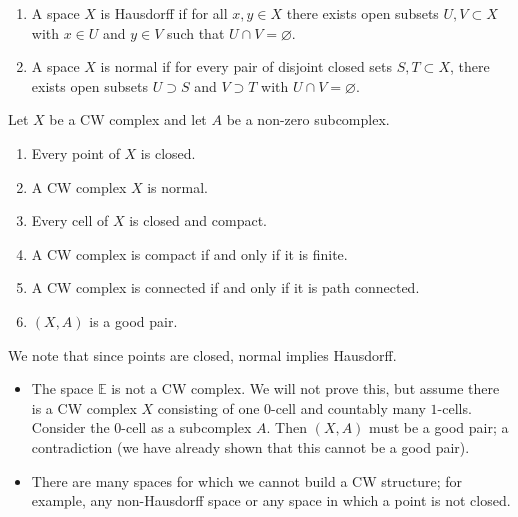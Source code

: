\begin{definition}
  \hspace{0em}
  \begin{enumerate}
    \item A space $X$ is Hausdorff if for all $x, y \in X$ there exists open subsets $U, V \subset X$ with $x \in U$ and $y \in V$ such that $U \cap V = \varnothing$.
    \item A space $X$ is normal if for every pair of disjoint closed sets $S, T \subset X$, there exists open subsets $U \supset S$ and $V \supset T$  with $U \cap V = \varnothing$.
  \end{enumerate}
\end{definition}

\begin{theorem}
  Let $X$ be a CW complex and let $A$ be a non-zero subcomplex.
  \begin{enumerate}
    \item Every point of $X$ is closed.
    \item A CW complex $X$ is normal.
    \item Every cell of $X$ is closed and compact.
    \item A CW complex is compact if and only if it is finite.
    \item A CW complex is connected if and only if it is path connected.
    \item $(X,A)$ is a good pair.
  \end{enumerate}
\end{theorem}

We note that since points are closed, normal implies Hausdorff.

\begin{example}
  \hspace{0em}
  \begin{itemize}
    \item The space $\mathbb E$ is not a CW complex. We will not prove this, but assume there is a CW complex $X$ consisting of one $0$-cell and countably many $1$-cells. Consider the $0$-cell as a subcomplex $A$. Then $(X,A)$ must be a good pair; a contradiction (we have already shown that this cannot be a good pair).
    \item There are many spaces for which we cannot build a CW structure; for example, any non-Hausdorff space or any space in which a point is not closed.
  \end{itemize}
\end{example}

